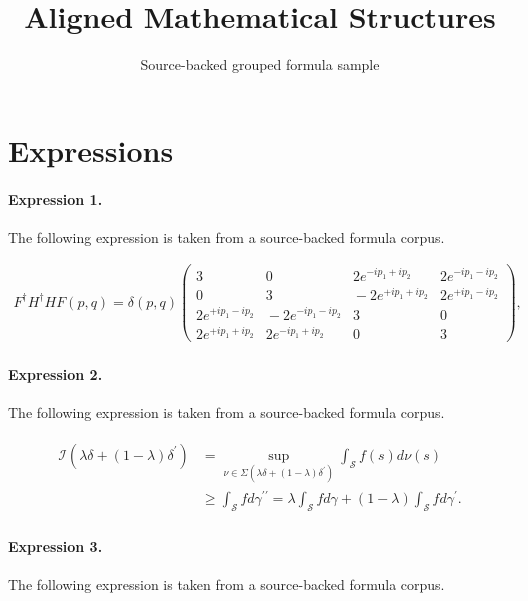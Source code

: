 \documentclass[11pt]{article}
\title{Aligned Mathematical Structures}
\author{Source-backed grouped formula sample}
\date{}
\begin{document}
\maketitle
\section{Expressions}
\paragraph{Expression 1.} The following expression is taken from a source-backed formula corpus.

\begin{align*}F^\dagger H^\dagger H F (p,q) = \delta(p,q)\!\left(\!\!\!\begin{array}{cccc} 3 & \! 0 & \!\!\!\!2 e^{-ip_1 + ip_2} & 2 e^{-ip_1 - ip_2} \\ 0 & \! 3 & \!\!\!\! -2 e^{+ip_1 + ip_2} & 2 e^{+ip_1 - ip_2} \\ 2 e^{+ip_1 - ip_2} & \! -2 e^{-ip_1 - ip_2} & \!\!\!\!3 & 0 \\ 2 e^{+ip_1 + ip_2} &\! 2 e^{-ip_1 + ip_2} & \!\!\!\! 0 & 3 \end{array}\!\!\! \right)\!,\end{align*}

\paragraph{Expression 2.} The following expression is taken from a source-backed formula corpus.

\begin{align*}\begin{aligned}\mathcal{I}(\lambda \delta + (1-\lambda) \delta^\prime ) & = \sup_{\nu \in \Sigma\left( \lambda \delta + (1-\lambda) \delta^\prime \right)} \int_{\mathcal{S} } f(s) d\nu(s) \\& \geq \int_{\mathcal{S} } f d \gamma^{\prime \prime} = \lambda \int_{\mathcal{S} } f d \gamma + (1-\lambda) \int_{\mathcal{S} } f d \gamma^{\prime }.\end{aligned}\end{align*}

\paragraph{Expression 3.} The following expression is taken from a source-backed formula corpus.
\end{document}

